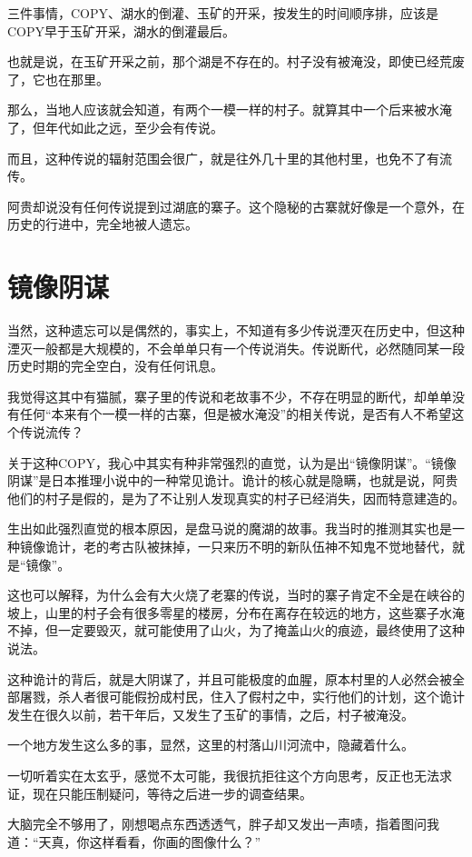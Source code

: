 三件事情，COPY、湖水的倒灌、玉矿的开采，按发生的时间顺序排，应该是COPY早于玉矿开采，湖水的倒灌最后。

也就是说，在玉矿开采之前，那个湖是不存在的。村子没有被淹没，即使已经荒废了，它也在那里。

那么，当地人应该就会知道，有两个一模一样的村子。就算其中一个后来被水淹了，但年代如此之远，至少会有传说。

而且，这种传说的辐射范围会很广，就是往外几十里的其他村里，也免不了有流传。

阿贵却说没有任何传说提到过湖底的寨子。这个隐秘的古寨就好像是一个意外，在历史的行进中，完全地被人遗忘。

\chapter{镜像阴谋}

当然，这种遗忘可以是偶然的，事实上，不知道有多少传说湮灭在历史中，但这种湮灭一般都是大规模的，不会单单只有一个传说消失。传说断代，必然随同某一段历史时期的完全空白，没有任何讯息。

我觉得这其中有猫腻，寨子里的传说和老故事不少，不存在明显的断代，却单单没有任何“本来有个一模一样的古寨，但是被水淹没”的相关传说，是否有人不希望这个传说流传？

关于这种COPY，我心中其实有种非常强烈的直觉，认为是出“镜像阴谋”。“镜像阴谋”是日本推理小说中的一种常见诡计。诡计的核心就是隐瞒，也就是说，阿贵他们的村子是假的，是为了不让别人发现真实的村子已经消失，因而特意建造的。

生出如此强烈直觉的根本原因，是盘马说的魔湖的故事。我当时的推测其实也是一种镜像诡计，老的考古队被抹掉，一只来历不明的新队伍神不知鬼不觉地替代，就是“镜像”。

这也可以解释，为什么会有大火烧了老寨的传说，当时的寨子肯定不全是在峡谷的坡上，山里的村子会有很多零星的楼房，分布在离存在较远的地方，这些寨子水淹不掉，但一定要毁灭，就可能使用了山火，为了掩盖山火的痕迹，最终使用了这种说法。

这种诡计的背后，就是大阴谋了，并且可能极度的血腥，原本村里的人必然会被全部屠戮，杀人者很可能假扮成村民，住入了假村之中，实行他们的计划，这个诡计发生在很久以前，若干年后，又发生了玉矿的事情，之后，村子被淹没。

一个地方发生这么多的事，显然，这里的村落山川河流中，隐藏着什么。

一切听着实在太玄乎，感觉不太可能，我很抗拒往这个方向思考，反正也无法求证，现在只能压制疑问，等待之后进一步的调查结果。

大脑完全不够用了，刚想喝点东西透透气，胖子却又发出一声啧，指着图问我道：“天真，你这样看看，你画的图像什么？”

